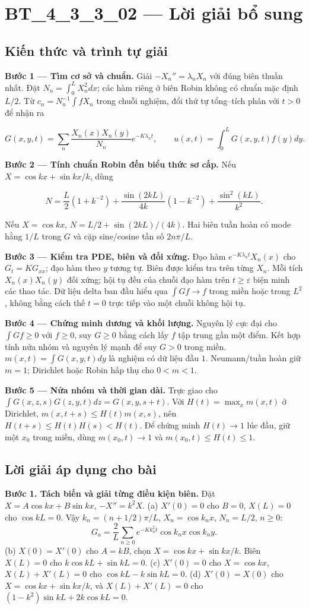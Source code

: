 \documentclass[10pt,a4paper]{article}
\begin{document}
\section*{BT\_4\_3\_3\_02 — Lời giải bổ sung}
\subsection*{Kiến thức và trình tự giải}
\textbf{Bước 1 — Tìm cơ sở và chuẩn.} Giải $-X_n''=\lambda_nX_n$ với đúng biên thuần nhất. Đặt $N_n=\int_0^LX_n^2dx$; các hàm riêng ở biên Robin không có chuẩn mặc định $L/2$. Từ $c_n=N_n^{-1}\int fX_n$ trong chuỗi nghiệm, đổi thứ tự tổng–tích phân với $t>0$ để nhận ra


\[
G(x,y,t)=\sum_n\frac{X_n(x)X_n(y)}{N_n}e^{-K\lambda_nt},\qquad
u(x,t)=\int_0^LG(x,y,t)f(y)dy.
\]


\textbf{Bước 2 — Tính chuẩn Robin đến biểu thức sơ cấp.} Nếu $X=\cos kx+\sin kx/k$, dùng


\[
N=\frac L2(1+k^{-2})+\frac{\sin(2kL)}{4k}(1-k^{-2})+\frac{\sin^2(kL)}{k^2}.
\]


Nếu $X=\cos kx$, $N=L/2+\sin(2kL)/(4k)$. Hai biên tuần hoàn có mode hằng $1/L$ trong $G$ và cặp sine/cosine tần số $2n\pi/L$.

\textbf{Bước 3 — Kiểm tra PDE, biên và đối xứng.} Đạo hàm $e^{-K\lambda_nt}X_n(x)$ cho $G_t=KG_{xx}$; đạo hàm theo $y$ tương tự. Biên được kiểm tra trên từng $X_n$. Mỗi tích $X_n(x)X_n(y)$ đối xứng; hội tụ đều của chuỗi đạo hàm trên $t\ge\varepsilon$ biện minh các thao tác. Dữ liệu delta ban đầu hiểu qua $\int Gf\to f$ trong miền hoặc trong $L^2$, không bằng cách thế $t=0$ trực tiếp vào một chuỗi không hội tụ.

\textbf{Bước 4 — Chứng minh dương và khối lượng.} Nguyên lý cực đại cho $\int Gf\ge0$ với $f\ge0$, suy $G\ge0$ bằng cách lấy $f$ tập trung gần một điểm. Kết hợp tính nửa nhóm và nguyên lý mạnh để suy $G>0$ trong miền. $m(x,t)=\int G(x,y,t)dy$ là nghiệm có dữ liệu đầu $1$. Neumann/tuần hoàn giữ $m=1$; Dirichlet hoặc Robin hấp thụ cho $0<m<1$.

\textbf{Bước 5 — Nửa nhóm và thời gian dài.} Trực giao cho $\int G(x,z,s)G(z,y,t)dz=G(x,y,s+t)$. Với $H(t)=\max_xm(x,t)$ ở Dirichlet, $m(x,t+s)\le H(t)m(x,s)$, nên $H(t+s)\le H(t)H(s)<H(t)$. Để chứng minh $H(t)\to1$ lúc đầu, giữ một $x_0$ trong miền, dùng $m(x_0,t)\to1$ và $m(x_0,t)\le H(t)\le1$.
\subsection*{Lời giải áp dụng cho bài}
\textbf{Bước 1. Tách biến và giải từng điều kiện biên.}
Đặt $X=A\cos kx+B\sin kx$, $-X''=k^2X$.
(a) $X'(0)=0$ cho $B=0$, $X(L)=0$ cho $\cos kL=0$. Vậy $k_n=(n+1/2)\pi/L$, $X_n=\cos k_nx$, $N_n=L/2$, $n\ge0$:
\[G_a=\frac2L\sum_{n\ge0}e^{-Kk_n^2t}\cos k_nx\cos k_ny.\]
(b) $X(0)=X'(0)$ cho $A=kB$, chọn $X=\cos kx+\sin kx/k$. Biên $X(L)=0$ cho $k\cos kL+\sin kL=0$.
(c) $X'(0)=0$ cho $X=\cos kx$, $X(L)+X'(L)=0$ cho $\cos kL-k\sin kL=0$.
(d) $X'(0)=X(0)$ cho $X=\cos kx+\sin kx/k$, và $X(L)+X'(L)=0$ cho $(1-k^2)\sin kL+2k\cos kL=0$.
\end{document}
